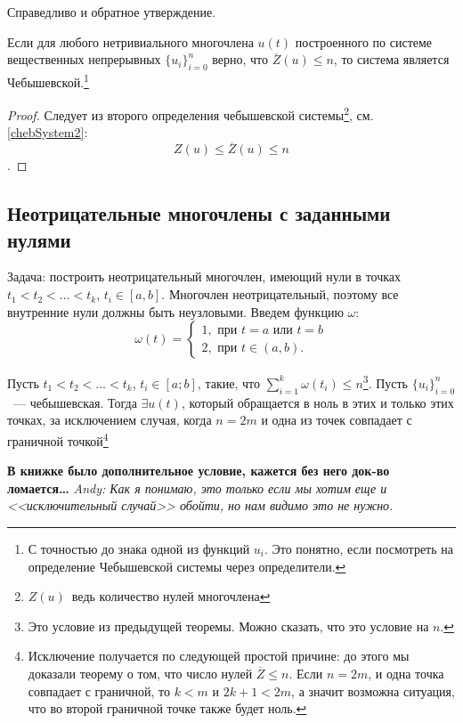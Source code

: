 Справедливо и обратное утверждение.

\begin{thm}
    Если для любого нетривиального многочлена $u(t)$ построенного по системе вещественных непрерывных $\{u_i\}_{i = 0}^n$
    верно, что $\overline{Z}(u) \leq n$, то система является Чебышевской.\footnote{С точностью до знака одной из функций $u_i$.
    Это понятно, если посмотреть на определение Чебышевской системы через определители.}
\end{thm}
\begin{proof}
Следует из второго определения чебышевской системы\footnote{$Z(u)$ ведь количество нулей многочлена}, см. \ref{chebSystem2}:
$$Z(u) \leq \overline{Z}(u) \leq n$$.
\end{proof}

\subsection{Неотрицательные многочлены с заданными нулями}
Задача: построить неотрицательный многочлен, имеющий нули в точках $t_1 < t_2 < … < t_k$, $t_i \in [a, b]$. Многочлен неотрицательный, поэтому все внутренние нули должны быть неузловыми. Введем функцию $\omega$:
$$ \omega(t) = \begin{cases}
    1, \text{ при }t = a \text{ или }t = b\\
    2, \text{ при }t \in (a, b).
\end{cases}
$$
\begin{thm}
    Пусть $t_1 < t_2 <  … < t_k$, $t_i \in [a; b]$, такие, что $\sum \limits_{i=1}^{k} \omega(t_i) \leq n$\footnote{Это условие из предыдущей теоремы.
    Можно сказать, что это условие на $n$.}. Пусть $\{u_i\}_{i=0}^{n}$ — чебышевская. Тогда $\exists u(t)$, который обращается в ноль в этих и только этих точках, за исключением случая, когда $n=2m$ и одна из точек совпадает с граничной точкой\footnote{Исключение получается по следующей простой причине: до этого мы доказали теорему о том, что число нулей $\overline{Z} \leq n$. Если $n=2m$, и одна точка совпадает с граничной, то $k < m$ и $2k+1 < 2m$, а значит возможна ситуация, что во второй граничной точке также будет ноль.}
\end{thm}

\textbf{В книжке было дополнительное условие, кажется без него док-во ломается…}
\textit{Andy: Как я понимаю, это только если мы хотим еще и <<исключительный случай>> обойти, но нам видимо это не нужно.}

